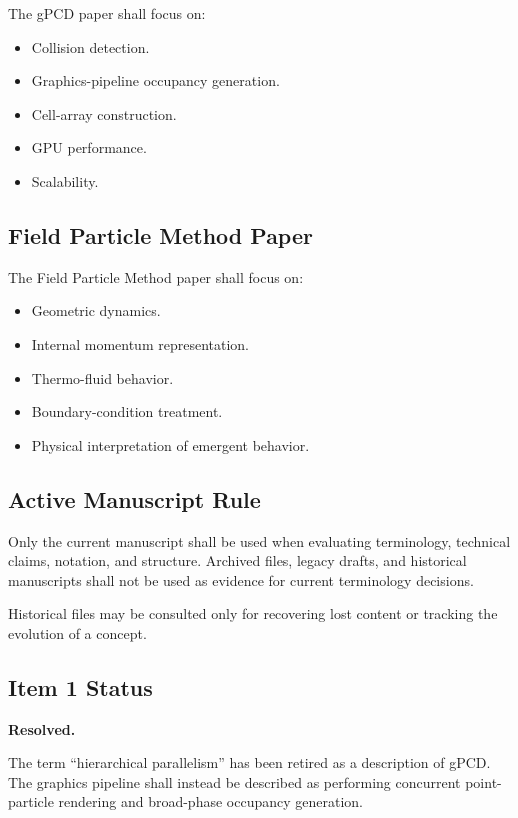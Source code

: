 The gPCD paper shall focus on:

\begin{itemize}
\item Collision detection.
\item Graphics-pipeline occupancy generation.
\item Cell-array construction.
\item GPU performance.
\item Scalability.
\end{itemize}

\subsection{Field Particle Method Paper}

The Field Particle Method paper shall focus on:

\begin{itemize}
\item Geometric dynamics.
\item Internal momentum representation.
\item Thermo-fluid behavior.
\item Boundary-condition treatment.
\item Physical interpretation of emergent behavior.
\end{itemize}

\subsection{Active Manuscript Rule}

Only the current manuscript shall be used when evaluating terminology,
technical claims, notation, and structure. Archived files, legacy drafts,
and historical manuscripts shall not be used as evidence for current
terminology decisions.

Historical files may be consulted only for recovering lost content or
tracking the evolution of a concept.

\subsection{Item 1 Status}

\textbf{Resolved.}

The term ``hierarchical parallelism'' has been retired as a description
of gPCD. The graphics pipeline shall instead be described as performing
concurrent point-particle rendering and broad-phase occupancy generation.

